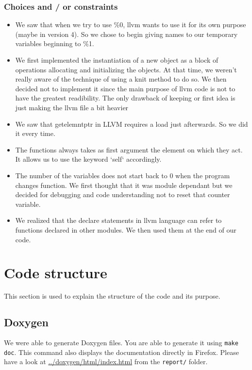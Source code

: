 \documentclass[a4paper,11pt]{article}
\begin{document}
  \subsubsection{Choices and / or constraints}
    \begin{itemize}
    \item We saw that when we try to use \%0, llvm wants to use it for its own purpose (maybe in version 4). So we chose to begin
    giving names to our temporary variables beginning to \%1.
    \item We first implemented the instantiation of a new object as a block of operations allocating and initializing the objects. 
    At that time, we weren't really aware of the technique of using a knit method to do so. We then decided not to implement it
    since the main purpose of llvm code is not to have the greatest readibility. The only drawback of keeping or first idea is just making the llvm file a bit heavier
    \item We saw that getelemntptr in LLVM requires a load just afterwards. So we did it every time.
    \item The functions always takes as first argument the element on which they act. It allows us to use the keyword `self` accordingly.
    \item The number of the variables does not start back to 0 when the program changes function.
    We first thought that it was module dependant but we decided for debugging and code understanding not to reset that counter variable.
    \item We realized that the declare statements in llvm language can refer to functions declared in other modules. We then used them at the end of our code.
    \end{itemize}

  \section{Code structure}
    This section is used to explain the structure of the code and its purpose.

\subsection{Doxygen}
  \label{Doxygen}
  We were able to generate Doxygen files. You are able to generate it using \texttt{make doc}. This command also displays the documentation directly in Firefox.
  Please have a look at \url{../doxygen/html/index.html} from the \texttt{report/} folder.
\end{document}

